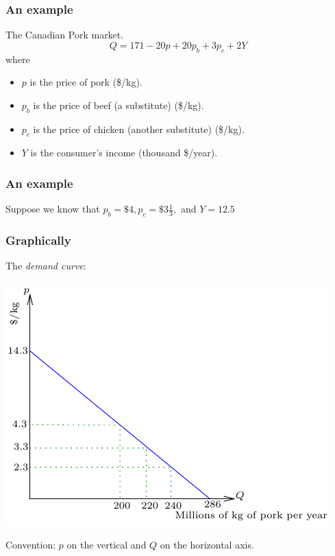 \documentclass[xcolor=pdftex,dvipsnames]{beamer}
\begin{document}
\begin{frame}
\frametitle{An example}
The Canadian Pork market.
\[
Q = 171 - 20p +20p_b + 3p_c +2Y
\]
where 
\begin{itemize}
\item $p$ is the price of pork (\$/kg).
\item $p_b$ is the price of beef (a substitute) (\$/kg).
\item $p_c$ is the price of chicken (another substitute) (\$/kg).
\item $Y$ is the consumer's income (thousand \$/year).
\end{itemize}


\end{frame}

\begin{frame}
\frametitle{An example}

Suppose we know that  $p_b=\$4, p_c=\$3\frac{1}{3},$ and $Y=12.5$
\bigskip



\end{frame}



\begin{frame}
\frametitle{Graphically}
The \emph{demand curve}:

\begin{center}
\includegraphics{pics/DemandCurve}
\end{center}

Convention: $p$ on the vertical and $Q$ on the horizontal axis.
\end{frame}
\end{document}
